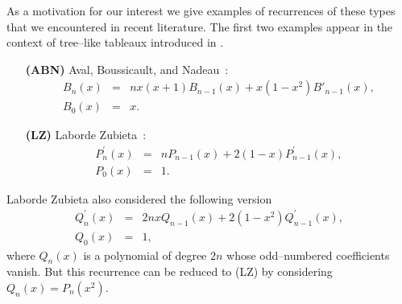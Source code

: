 \documentclass[10pt]{amsart}
\numberwithin{subcase}{case}
\begin{document}
As a motivation for our interest we give examples of recurrences of these types  that we encountered in recent literature. The first two examples appear in the context of tree--like tableaux introduced in \cite{ABN}. 
\begin{itemize}

\item[{\bf(ABN)}]{}  Aval,  Boussicault, and Nadeau~\cite{ABN}: 
\begin{eqnarray*}B_{n}(x)&=&nx(x+1)B_{n-1}(x)+x(1-x^2)B'_{n-1}(x),\\ B_{0}(x)&=&x.\end{eqnarray*} 
\item[{\bf(LZ)}]{}
  Laborde Zubieta~\cite{LZ}:
\begin{eqnarray*}
P^{'}_n(x)&=&nP_{n-1}(x)+2(1-x)P_{n-1}^{'}(x),\\ P_0(x)&=&1.\end{eqnarray*}
\end{itemize}
Laborde Zubieta also considered the following version 
\begin{eqnarray*}
Q^{'}_n(x)&=&2nxQ_{n-1}(x)+2(1-x^2)Q_{n-1}^{'}(x),\\ Q_0(x)&=&1,
\end{eqnarray*}
where $Q_n(x)$ is a polynomial of degree $2n$ whose odd--numbered coefficients vanish. But this recurrence can be reduced to (LZ) by considering $Q_n(x)=P_n(x^2)$. 
\end{document}
